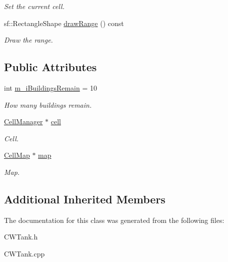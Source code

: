 \begin{DoxyCompactItemize}
\begin{DoxyCompactList}\small\item\em Set the current cell. \end{DoxyCompactList}\item 
\mbox{\label{class_c_w_tank_a4e1c5106a09807ad25295b696c0e7525}} 
sf\+::\+Rectangle\+Shape \mbox{\hyperlink{class_c_w_tank_a4e1c5106a09807ad25295b696c0e7525}{draw\+Range}} () const
\begin{DoxyCompactList}\small\item\em Draw the range. \end{DoxyCompactList}\end{DoxyCompactItemize}
\subsection*{Public Attributes}
\begin{DoxyCompactItemize}
\item 
\mbox{\label{class_c_w_tank_ac18fc7979fc397fa3ab2cc64f90d2bb6}} 
int \mbox{\hyperlink{class_c_w_tank_ac18fc7979fc397fa3ab2cc64f90d2bb6}{m\+\_\+i\+Buildings\+Remain}} = 10
\begin{DoxyCompactList}\small\item\em How many buildings remain. \end{DoxyCompactList}\item 
\mbox{\label{class_c_w_tank_ad9b30cb1f9284dbf89821f5d4084dd70}} 
\mbox{\hyperlink{class_cell_manager}{Cell\+Manager}} $\ast$ \mbox{\hyperlink{class_c_w_tank_ad9b30cb1f9284dbf89821f5d4084dd70}{cell}}
\begin{DoxyCompactList}\small\item\em Cell. \end{DoxyCompactList}\item 
\mbox{\label{class_c_w_tank_ac0c2722b26c2138d539114f60802d707}} 
\mbox{\hyperlink{class_cell_map}{Cell\+Map}} $\ast$ \mbox{\hyperlink{class_c_w_tank_ac0c2722b26c2138d539114f60802d707}{map}}
\begin{DoxyCompactList}\small\item\em Map. \end{DoxyCompactList}\end{DoxyCompactItemize}
\subsection*{Additional Inherited Members}


The documentation for this class was generated from the following files\+:\begin{DoxyCompactItemize}
\item 
C\+W\+Tank.\+h\item 
C\+W\+Tank.\+cpp\end{DoxyCompactItemize}
